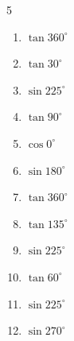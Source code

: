 \begin{multicols}{5}
\begin{enumerate}
        \phantom{$\displaystyle =0$}

  \item $\displaystyle \tan{360^\circ}$

        \phantom{$\displaystyle =0$}

  \item $\displaystyle \tan{30^\circ}$


  \item $\displaystyle \sin{225^\circ}$


  \item $\displaystyle \tan{90^\circ}$

        \phantom{$\displaystyle なし$}

  \item $\displaystyle \cos{0^\circ}$

        \phantom{$\displaystyle =1$}

  \item $\displaystyle \sin{180^\circ}$

        \phantom{$\displaystyle =0$}

  \item $\displaystyle \tan{360^\circ}$

        \phantom{$\displaystyle =0$}

  \item $\displaystyle \tan{135^\circ}$

        \phantom{$\displaystyle =-1$}

  \item $\displaystyle \sin{225^\circ}$


  \item $\displaystyle \tan{60^\circ}$


\columnbreak %

  \item $\displaystyle \sin{225^\circ}$


  \item $\displaystyle \sin{270^\circ}$

        \phantom{$\displaystyle =-1$}


\end{enumerate}
\end{multicols}
